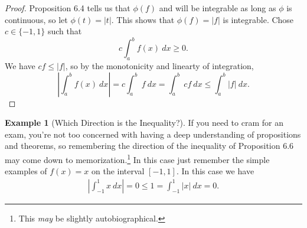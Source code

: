 \documentclass{article}
\theoremstyle{definition}
\newtheorem{example}{Example}[section]
\begin{document}
\begin{proof}
	Proposition 6.4 tells us that $ \phi(f) $ and will be integrable as long as $ \phi $ is continuous, so let $ \phi(t)=|t| $. This shows that $ \phi(f)=|f| $ is integrable. Chose $ c\in\{-1,1\} $ such that $$c\int_{a}^{b}f(x)\ dx\ge 0 .$$ We have $ cf\le|f| $, so by the monotonicity and linearty of integration, $$\left\lvert\int_{a}^{b}f(x)\ dx\right\rvert =c\int_{a}^{b}\ f \ dx =\int_{a}^{b}\ cf\ dx \le \int_{a}^{b}|f|\ dx. $$ 
\end{proof}
\begin{example}[Which Direction is the Inequality?]
	If you need to cram for an exam, you're not too concerned with having a deep understanding of propositions and theorems, so remembering the direction of the inequality of Proposition 6.6 may come down to memorization.\footnote{This \textit{may} be slightly autobiographical.} In this case just remember the simple examples of $ f(x)=x $ on the interval $ [-1,1] $. In this case we have \begin{align*}
		\left\lvert\int_{-1}^{1}x\ dx \right\rvert=0\le 1=\int_{-1}^{1}|x|\ dx =0.
	\end{align*}
\end{example}
\end{document}
